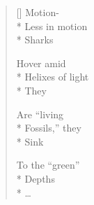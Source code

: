 \label{ch:sharks}
\settowidth{\versewidth}{\hspace*{3\vgap} \ldots}
\begin{verse}[\versewidth]
\hspace*{1\vgap} Motion-\\*
Less in motion\\*
\hspace*{3\vgap} Sharks

\hspace*{1\vgap} Hover amid\\*
Helixes of light\\*
\hspace*{3\vgap} They

\hspace*{1\vgap} Are ``living\\*
Fossils,'' they\\*
\hspace*{3\vgap} Sink

\hspace*{1\vgap} To the ``green''\\*
Depths\\*
\hspace*{3\vgap} \ldots
\end{verse}
